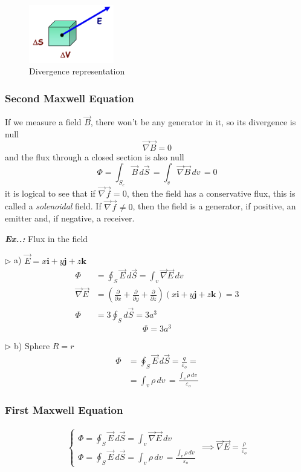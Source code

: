 \documentclass[a4paper]{article}
\begin{document}
\begin{figure}[H]
    \centering
    \includegraphics[width=0.33\textwidth]{IMG/div.png}
    \caption{Divergence representation}
    \label{fig:div}
\end{figure}

\subsubsection{Second Maxwell Equation}
\setcounter{equation}{0}
If we measure a field $\vec{B}$, there won't be any generator in it, so its divergence is null
$$
\boxed{\vec{\nabla}\vec{B}=0}
$$
and the flux through a closed section is also null
$$
\Phi=\int _{S_c} \vec{B}\,d\vec{S} \,=\int _{v} \vec{\nabla}\vec{B}\, dv\, =0
$$
it is logical to see that if $\vec{\nabla}\vec{f}=0$, then the field has a conservative flux, this is called a \textit{solenoidal} field. If $\vec{\nabla}\vec{f}\neq 0$, then the field is a generator, if positive, an emitter and, if negative, a receiver.

\vspace{2ex}\textbf{\textit{Ex.\thesection.\theex: }}Flux in the field 

$\triangleright$ a) $\vec{E}=x\mathbf{i}+y\mathbf{j}+z\mathbf{k}$ 
\begin{align}
\Phi&=\oint_{S}\vec{E}\,d\vec{S}=\int _{v}\vec{\nabla}\vec{E} \, dv\,  \\
\vec{\nabla}\vec{E}&=\left( \frac{\partial}{\partial x}+\frac{\partial}{\partial y}+\frac{\partial}{\partial z} \right)(x\mathbf{i}+y\mathbf{j}+z\mathbf{k})=3 \\
\Phi&=3\oint_{S}d\vec{S}=3a^{3}
\end{align}
$$
\boxed{\Phi=3a^{3}}
$$

$\triangleright$ b) Sphere $R=r$
\begin{align}
\Phi&=\oint_{S}\vec{E}\,d\vec{S}=\frac{q}{\varepsilon_{o}}= \\
&=\int _{v}\rho \, dv\, =\frac{\int _{v}\rho \, dv\, }{\varepsilon_{o}}
\end{align}
\subsubsection{First Maxwell Equation}
\setcounter{equation}{0}
\begin{align}
\begin{cases}
\Phi=\oint_{S}\vec{E}\,d\vec{S}=\int _{v}\vec{\nabla}\vec{E} \, dv\, \\
\Phi=\oint_{S}\vec{E}\,d\vec{S}=\int _{v}\rho \, dv\, =\frac{\int _{v}\rho \, dv\,}{\varepsilon_{o}}
\end{cases}\implies \boxed{\vec{\nabla}\vec{E}=\frac{\rho}{\varepsilon_{o}}}
\end{align}
\end{document}
